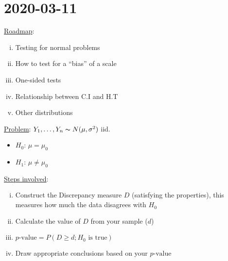 \section{2020-03-11}
\underline{Roadmap}:
\begin{enumerate}[(i)]
    \item Testing for normal problems
    \item How to test for a ``bias'' of a scale
    \item One-sided tests
    \item Relationship between C.I and H.T
    \item Other distributions
\end{enumerate}
\underline{Problem}: $ Y_1,\ldots ,Y_n \thicksim N(\mu,\sigma^2) $ iid.
\begin{itemize}
    \item $ H_0 $: $ \mu=\mu_0 $
    \item $ H_1 $: $ \mu\neq \mu_0 $
\end{itemize}
\underline{Steps involved}:
\begin{enumerate}[(i)]
    \item Construct the Discrepancy measure $ D $ (satisfying the properties), this
          measures how much the data disagrees with $ H_0 $
    \item Calculate the value of $ D $ from your sample ($ d $)
    \item $ p\text{-value}=P(D\geqslant d; H_0\text{ is true}) $
    \item Draw appropriate conclusions based on your $ p\text{-value} $
\end{enumerate}

